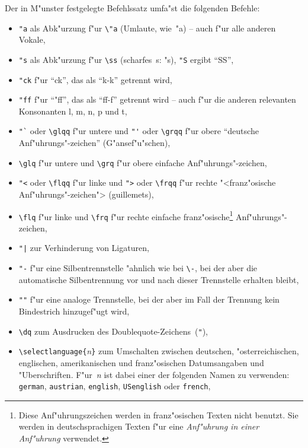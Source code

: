 Der in M"unster festgelegte Befehlssatz umfa"st die folgenden
Befehle:
\begin{itemize}
\item
\verb:"a: als Abk"urzung f"ur \verb:\"a: (Umlaute, wie~"a)
-- auch f"ur alle anderen Vokale,

\item
\verb:"s: als Abk"urzung f"ur \verb:\ss: (scharfes~s: "s),
\verb:"S: ergibt "`SS"',

\item
\verb:"ck:  f"ur "`ck"', das als "`k-k"' getrennt wird,

\item
\verb:"ff: f"ur "`"ff"', das als "`ff-f"' getrennt wird -- auch
f"ur die anderen relevanten Konsonanten l, m, n, p und t,

\item
\verb:"`: oder \verb:\glqq: f"ur untere und
\verb:"': oder \verb:\grqq: f"ur obere
"`deutsche An\-f"uh\-rungs"-zeichen"'
(\glqq G"ansef"u"schen\grqq),

\item
\verb:\glq: f"ur untere und \verb:\grq: f"ur obere
\glq einfache An\-f"uh\-rungs"-zeichen\grq ,

\item
\verb:"<: oder \verb:\flqq: f"ur linke und
\verb:">: oder \verb:\frqq: f"ur rechte "<franz"osische
An\-f"uh\-rungs"-zeichen">
(\flqq guillemets\frqq),

\item
\verb:\flq: f"ur linke und
\verb:\frq: f"ur rechte \flq einfache
franz"osische\footnote{Diese Anf"uhrungszeichen werden in
franz"osischen Texten nicht benutzt. Sie werden in
deutschsprachigen Texten f"ur eine {\em Anf"uhrung in einer
Anf"uhrung\/} verwendet.} An\-f"uh\-rungs"-zeichen\frq,

\item
\verb."|. zur Verhinderung von Ligaturen,

\item
\verb:"-: f"ur eine Silbentrennstelle "ahnlich wie bei
\verb:\-:, bei der aber die automatische Silbentrennung vor und
nach dieser Trennstelle erhalten bleibt,

\item
\verb:"": f"ur eine analoge Trennstelle, bei der aber im Fall
der Trennung kein Bindestrich hinzugef"ugt wird,

\item
\verb:\dq: zum Ausdrucken des Doublequote-Zeichens~(\verb:":),

\item
\verb:\selectlanguage{:{\it n\/}\verb:}: zum Umschalten zwischen
deutschen, "osterreichischen, englischen, amerikanischen und
franz"osischen Datumsangaben und "Uberschriften. F"ur~{\it n\/}
ist dabei einer der folgenden Namen zu verwenden: \verb:german:,
\verb:austrian:, \verb:english:, \verb:USenglish: oder
\verb:french:,


\end{itemize}
